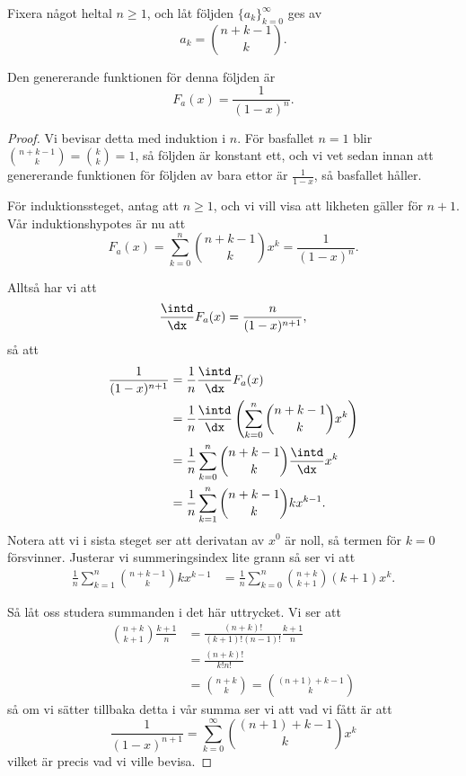 \documentclass[nobib]{tufte-handout}
\begin{document}
\begin{lemma}
    Fixera något heltal $n\geq 1$, och låt följden $\{a_k\}_{k=0}^\infty$ ges av
    $$a_k = \binom{n+k-1}{k}.$$

    Den genererande funktionen för denna följden är
    $$F_a(x) = \frac{1}{(1-x)^n}.$$

    \begin{proof}
        Vi bevisar detta med induktion i $n$. För basfallet $n=1$ blir $\binom{n+k-1}{k} = \binom{k}{k} = 1$, så följden är konstant ett, och vi vet sedan innan att genererande funktionen för följden av bara ettor är $\frac{1}{1 - x}$, så basfallet håller.

        För induktionssteget, antag att $n \geq 1$, och vi vill visa att likheten gäller för $n+1$. Vår induktionshypotes är nu att
        $$F_a(x) = \sum_{k=0}^{n} \binom{n+k-1}{k}x^k = \frac{1}{(1 - x)^n}.$$
        
        Alltså har vi att
        $$\frac{\intd}{\dx} F_a(x) = \frac{n}{(1-x)^{n+1}},$$
        så att
        \begin{align*}
            \frac{1}{(1-x)^{n+1}} &= \frac{1}{n}\frac{\intd}{\dx} F_a(x)\\
            &= \frac{1}{n} \frac{\intd}{\dx}\left(\sum_{k=0}^{n} \binom{n+k-1}{k}x^k\right)\\
            &= \frac{1}{n}\sum_{k=0}^{n} \binom{n+k-1}{k}\frac{\intd}{\dx}x^k\\
            &= \frac{1}{n}\sum_{k=1}^{n} \binom{n+k-1}{k}k x^{k-1}.
        \end{align*}
        Notera att vi i sista steget ser att derivatan av $x^0$ är noll, så termen för $k=0$ försvinner. Justerar vi summeringsindex lite grann så ser vi att
        \begin{align*}
            \frac{1}{n}\sum_{k=1}^{n} \binom{n+k-1}{k}k x^{k-1} &= \frac{1}{n}\sum_{k=0}^{n} \binom{n+k}{k+1}(k+1) x^{k}.
        \end{align*}

        Så låt oss studera summanden i det här uttrycket. Vi ser att
        \begin{align*}
            \binom{n+k}{k+1}\frac{k+1}{n} &= \frac{(n+k)!}{(k+1)!(n-1)!}\frac{k+1}{n}\\
            &= \frac{(n+k)!}{k!n!}\\
            &= \binom{n+k}{k} = \binom{(n+1) + k - 1}{k}
        \end{align*}
        så om vi sätter tillbaka detta i vår summa ser vi att vad vi fått är att
        $$\frac{1}{(1-x)^{n+1}} = \sum_{k=0}^{\infty} \binom{(n+1) + k - 1}{k} x^k$$
        vilket är precis vad vi ville bevisa.
    \end{proof}
\end{lemma}
\end{document}

